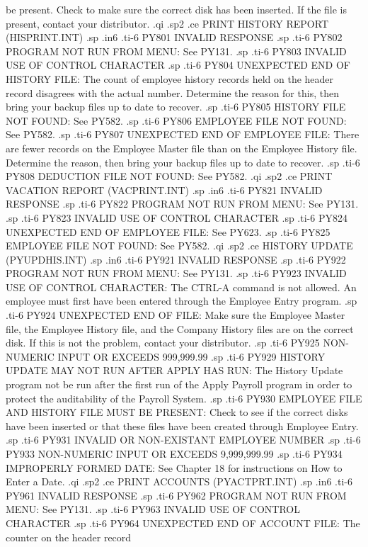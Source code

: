 be present.  Check to make sure the correct disk has been inserted.  If
the file is present, contact your distributor.
.qi
.sp2
.ce
PRINT HISTORY REPORT (HISPRINT.INT)
.sp
.in6
.ti-6
PY801 INVALID RESPONSE
.sp
.ti-6
PY802 PROGRAM NOT RUN FROM MENU: See PY131.
.sp
.ti-6
PY803 INVALID USE OF CONTROL CHARACTER
.sp
.ti-6
PY804 UNEXPECTED END OF HISTORY FILE: The count of employee history records
held on the header record disagrees with the actual number.
Determine the reason for this, then bring your backup files up to date to
recover.
.sp
.ti-6
PY805 HISTORY FILE NOT FOUND: See PY582.
.sp
.ti-6
PY806 EMPLOYEE FILE NOT FOUND: See PY582.
.sp
.ti-6
PY807 UNEXPECTED END OF EMPLOYEE FILE: There are fewer records on the
Employee Master file than on the Employee History file.  Determine the
reason, then bring your backup files up to date to recover.
.sp
.ti-6
PY808 DEDUCTION FILE NOT FOUND: See PY582.
.qi
.sp2
.ce
PRINT VACATION REPORT  (VACPRINT.INT)
.sp
.in6
.ti-6
PY821 INVALID RESPONSE
.sp
.ti-6
PY822 PROGRAM NOT RUN FROM MENU: See PY131.
.sp
.ti-6
PY823 INVALID USE OF CONTROL CHARACTER
.sp
.ti-6
PY824 UNEXPECTED END OF EMPLOYEE FILE: See PY623.
.sp
.ti-6
PY825 EMPLOYEE FILE NOT FOUND: See PY582.
.qi
.sp2
.ce
HISTORY UPDATE (PYUPDHIS.INT)
.sp
.in6
.ti-6
PY921 INVALID RESPONSE
.sp
.ti-6
PY922 PROGRAM NOT RUN FROM MENU: See PY131.
.sp
.ti-6
PY923 INVALID USE OF CONTROL CHARACTER: The CTRL-A command is not allowed.
An employee must first have been entered through the Employee Entry program.
.sp
.ti-6
PY924 UNEXPECTED END OF FILE: Make sure the Employee Master file, the
Employee History file, and the Company History files are on the correct
disk.  If this is not the problem, contact your distributor.
.sp
.ti-6
PY925 NON-NUMERIC INPUT OR EXCEEDS 999,999.99
.sp
.ti-6
PY929 HISTORY UPDATE MAY NOT RUN AFTER APPLY HAS RUN:  The History Update
program not be run after the first run of the Apply Payroll program in order to
protect the auditability of the Payroll System.
.sp
.ti-6
PY930 EMPLOYEE FILE AND HISTORY FILE MUST BE PRESENT: Check to see if the
correct disks have been inserted or that these files have been created
through Employee Entry.
.sp
.ti-6
PY931 INVALID OR NON-EXISTANT EMPLOYEE NUMBER
.sp
.ti-6
PY933 NON-NUMERIC INPUT OR EXCEEDS 9,999,999.99
.sp
.ti-6
PY934 IMPROPERLY FORMED DATE: See Chapter 18 for instructions on How
to Enter a Date.
.qi
.sp2
.ce
PRINT ACCOUNTS	(PYACTPRT.INT)
.sp
.in6
.ti-6
PY961 INVALID RESPONSE
.sp
.ti-6
PY962 PROGRAM NOT RUN FROM MENU: See PY131.
.sp
.ti-6
PY963 INVALID USE OF CONTROL CHARACTER
.sp
.ti-6
PY964 UNEXPECTED END OF ACCOUNT FILE: The counter on the header record
